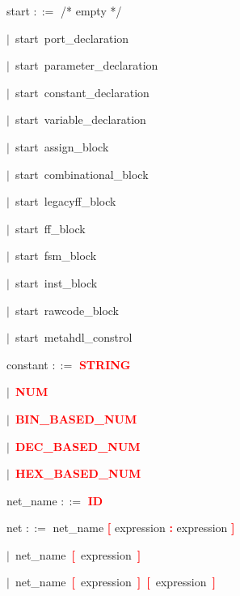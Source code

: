 
\vspace{1em}
\noindent
\settowidth{\parindent}{\hspace{4ex}}
start $::=$\hspace{1ex} /* empty */

\mbox{$|$ start port\_declaration}

\mbox{$|$ start parameter\_declaration}

\mbox{$|$ start constant\_declaration}

\mbox{$|$ start variable\_declaration}

\mbox{$|$ start assign\_block}

\mbox{$|$ start combinational\_block}

\mbox{$|$ start legacyff\_block}

\mbox{$|$ start ff\_block}

\mbox{$|$ start fsm\_block}

\mbox{$|$ start inst\_block}

\mbox{$|$ start rawcode\_block}

\mbox{$|$ start metahdl\_constrol}

\vspace{1em}
\noindent
\settowidth{\parindent}{\hspace{4ex}}
constant $::=$\hspace{1ex} \textbf{\textcolor{red}{STRING}}

\mbox{$|$ \textbf{\textcolor{red}{NUM}}}

\mbox{$|$ \textbf{\textcolor{red}{BIN\_BASED\_NUM}}}

\mbox{$|$ \textbf{\textcolor{red}{DEC\_BASED\_NUM}}}

\mbox{$|$ \textbf{\textcolor{red}{HEX\_BASED\_NUM}}}

\vspace{1em}
\noindent
\settowidth{\parindent}{\hspace{4ex}}
net\_name $::=$\hspace{1ex} \textbf{\textcolor{red}{ID}}

\vspace{1em}
\noindent
\settowidth{\parindent}{\hspace{4ex}}
net $::=$\hspace{1ex} net\_name \textbf{\textcolor{red}{[}} expression \textbf{\textcolor{red}{:}} expression \textbf{\textcolor{red}{]}}

\mbox{$|$ net\_name \textbf{\textcolor{red}{[}} expression \textbf{\textcolor{red}{]}}}

\mbox{$|$ net\_name \textbf{\textcolor{red}{[}} expression \textbf{\textcolor{red}{]}} \textbf{\textcolor{red}{[}} expression \textbf{\textcolor{red}{]}}}

